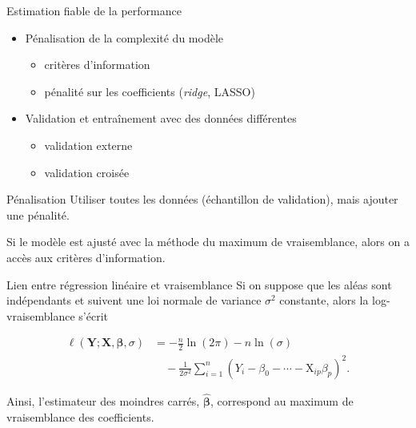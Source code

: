 \documentclass[
  ignorenonframetext,
]{beamer}
\providecommand{\tightlist}{%
  \setlength{\itemsep}{0pt}\setlength{\parskip}{0pt}}\usepackage{longtable,booktabs,array}
\begin{document}
\begin{frame}{Estimation fiable de la performance}
\protect\hypertarget{estimation-fiable-de-la-performance}{}
\begin{itemize}
\tightlist
\item
  Pénalisation de la complexité du modèle

  \begin{itemize}
  \tightlist
  \item
    critères d'information
  \item
    pénalité sur les coefficients (\emph{ridge}, LASSO)
  \end{itemize}
\item
  Validation et entraînement avec des données différentes

  \begin{itemize}
  \tightlist
  \item
    validation externe
  \item
    validation croisée
  \end{itemize}
\end{itemize}
\end{frame}

\begin{frame}{Pénalisation}
\protect\hypertarget{puxe9nalisation}{}
Utiliser toutes les données (échantillon de validation), mais ajouter
une pénalité.

Si le modèle est ajusté avec la méthode du maximum de vraisemblance,
alors on a accès aux critères d'information.
\end{frame}

\begin{frame}{Lien entre régression linéaire et vraisemblance}
\protect\hypertarget{lien-entre-ruxe9gression-linuxe9aire-et-vraisemblance}{}
Si on suppose que les aléas sont indépendants et suivent une loi normale
de variance \(\sigma^2\) constante, alors la log-vraisemblance s'écrit

\begin{align*}
\ell(\boldsymbol{Y}; \mathbf{X}, \boldsymbol{\beta}, \sigma) & = -\frac{n}{2}\ln(2\pi) -n\ln(\sigma) \\&\quad - \frac{1}{2\sigma^2}\sum_{i=1}^n (Y_i - \beta_0 - \cdots - \mathrm{X}_{ip}\beta_p)^2.
\end{align*}

Ainsi, l'estimateur des moindres carrés,
\(\widehat{\boldsymbol{\beta}}\), correspond au maximum de vraisemblance
des coefficients.
\end{frame}
\end{document}
